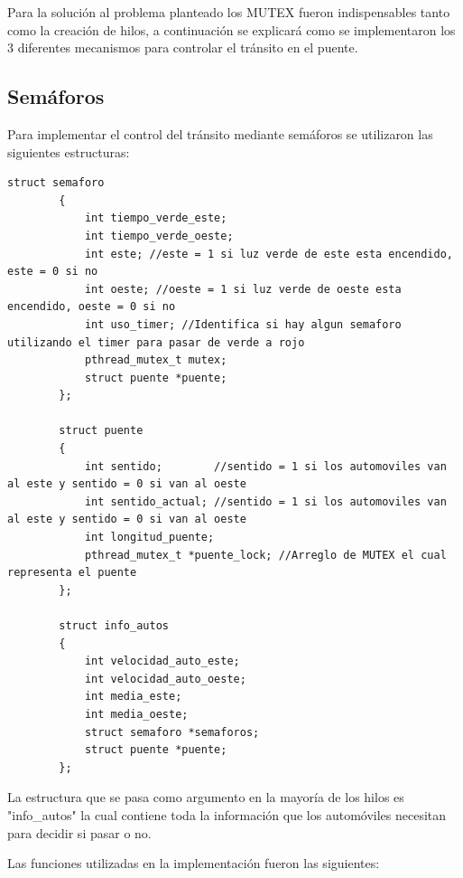 \documentclass[16pt,a4papper]{article}
\begin{document}
	Para la solución al problema planteado los MUTEX fueron indispensables tanto como la creación de hilos, a continuación se explicará como se implementaron los 3 diferentes mecanismos para controlar el tránsito en el puente.
	
	\subsection{Semáforos}
	Para implementar el control del tránsito mediante semáforos se utilizaron las siguientes estructuras:
	
	\begin{lstlisting}[style=CStyle]
		struct semaforo
		{
			int tiempo_verde_este;
			int tiempo_verde_oeste;
			int este; //este = 1 si luz verde de este esta encendido, este = 0 si no 
			int oeste; //oeste = 1 si luz verde de oeste esta encendido, oeste = 0 si no
			int uso_timer; //Identifica si hay algun semaforo utilizando el timer para pasar de verde a rojo
			pthread_mutex_t mutex; 
			struct puente *puente; 
		};
		
		struct puente
		{
			int sentido;        //sentido = 1 si los automoviles van al este y sentido = 0 si van al oeste
			int sentido_actual; //sentido = 1 si los automoviles van al este y sentido = 0 si van al oeste
			int longitud_puente;
			pthread_mutex_t *puente_lock; //Arreglo de MUTEX el cual representa el puente
		};
		
		struct info_autos 
		{
			int velocidad_auto_este;
			int velocidad_auto_oeste;
			int media_este;
			int media_oeste;
			struct semaforo *semaforos;
			struct puente *puente;
		};
	\end{lstlisting}
	
	La estructura que se pasa como argumento en la mayoría de los hilos es "info\_autos" la cual contiene toda la información que los automóviles necesitan para decidir si pasar o no.
	
	Las funciones utilizadas en la implementación fueron las siguientes:
	
\end{document}
